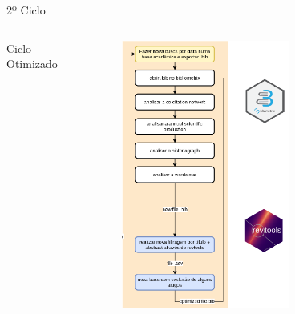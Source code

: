 \begin{frame}{2º Ciclo}
	\begin{columns}
        Ciclo Otimizado
		\begin{figure}[hb]
      \includegraphics[width=0.65\textwidth]{figures/ciclo2.png}
		\end{figure}
	\end{columns}
\end{frame}

